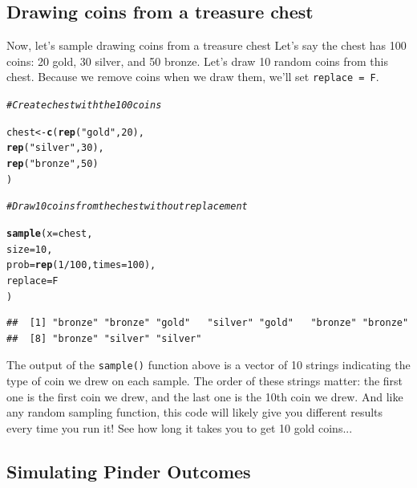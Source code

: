 \documentclass{tufte-book}\usepackage[]{graphicx}\usepackage[]{color}
\makeatletter
\newcommand{\hlnum}[1]{\textcolor[rgb]{0.686,0.059,0.569}{#1}}%
\newcommand{\hlstr}[1]{\textcolor[rgb]{0.192,0.494,0.8}{#1}}%
\newcommand{\hlcom}[1]{\textcolor[rgb]{0.678,0.584,0.686}{\textit{#1}}}%
\newcommand{\hlopt}[1]{\textcolor[rgb]{0,0,0}{#1}}%
\newcommand{\hlstd}[1]{\textcolor[rgb]{0.345,0.345,0.345}{#1}}%
\newcommand{\hlkwb}[1]{\textcolor[rgb]{0.69,0.353,0.396}{#1}}%
\newcommand{\hlkwc}[1]{\textcolor[rgb]{0.333,0.667,0.333}{#1}}%
\newcommand{\hlkwd}[1]{\textcolor[rgb]{0.737,0.353,0.396}{\textbf{#1}}}%
\newenvironment{kframe}{%
 \def\at@end@of@kframe{}%
 \ifinner\ifhmode%
  \def\at@end@of@kframe{\end{minipage}}%
  \begin{minipage}{\columnwidth}%
 \fi\fi%
 \def\FrameCommand##1{\hskip\@totalleftmargin \hskip-\fboxsep
 \colorbox{shadecolor}{##1}\hskip-\fboxsep
     \hskip-\linewidth \hskip-\@totalleftmargin \hskip\columnwidth}%
 \MakeFramed {\advance\hsize-\width
   \@totalleftmargin\z@ \linewidth\hsize
   \@setminipage}}%
 {\par\unskip\endMakeFramed%
 \at@end@of@kframe}
\newenvironment{knitrout}{}{} %
\makeatother
\begin{document}
\subsection{Drawing coins from a treasure chest}

Now, let's sample drawing coins from a treasure chest Let's say the chest has 100 coins: 20 gold, 30 silver, and 50 bronze. Let's draw 10 random coins from this chest. Because we remove coins when we draw them, we'll set \texttt{replace = F}.

\begin{knitrout}
\color{fgcolor}\begin{kframe}
\begin{alltt}
\hlcom{# Create chest with the 100 coins}

\hlstd{chest} \hlkwb{<-} \hlkwd{c}\hlstd{(}\hlkwd{rep}\hlstd{(}\hlstr{"gold"}\hlstd{,} \hlnum{20}\hlstd{),}
         \hlkwd{rep}\hlstd{(}\hlstr{"silver"}\hlstd{,} \hlnum{30}\hlstd{),}
         \hlkwd{rep}\hlstd{(}\hlstr{"bronze"}\hlstd{,} \hlnum{50}\hlstd{)}
         \hlstd{)}

\hlcom{# Draw 10 coins from the chest without replacement}

\hlkwd{sample}\hlstd{(}\hlkwc{x} \hlstd{= chest,}
       \hlkwc{size} \hlstd{=} \hlnum{10}\hlstd{,}
       \hlkwc{prob} \hlstd{=} \hlkwd{rep}\hlstd{(}\hlnum{1} \hlopt{/} \hlnum{100}\hlstd{,} \hlkwc{times} \hlstd{=} \hlnum{100}\hlstd{),}
       \hlkwc{replace} \hlstd{= F}
       \hlstd{)}
\end{alltt}
\begin{verbatim}
##  [1] "bronze" "bronze" "gold"   "silver" "gold"   "bronze" "bronze"
##  [8] "bronze" "silver" "silver"
\end{verbatim}
\end{kframe}
\end{knitrout}

The output of the \texttt{sample()} function above is a vector of 10 strings indicating the type of coin we drew on each sample. The order of these strings matter: the first one is the first coin we drew, and the last one is the 10th coin we drew. And like any random sampling function, this code will likely give you different results every time you run it! See how long it takes you to get 10 gold coins...

\subsection{Simulating Pinder Outcomes}
\end{document}
